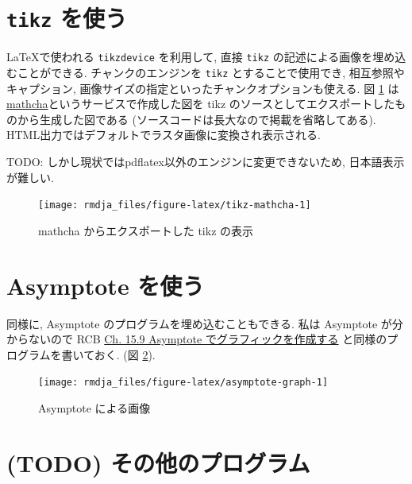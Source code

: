 \documentclass[
  xelatex,ja=standard,jafont=noto]{bxjsbook}
\theoremstyle{definition}
\theoremstyle{definition}
\theoremstyle{definition}
\theoremstyle{definition}
\theoremstyle{remark}
\begin{document}
\hypertarget{tikz-ux3092ux4f7fux3046}{%
\section{\texorpdfstring{\texttt{tikz}
を使う}{tikz を使う}}\label{tikz-ux3092ux4f7fux3046}}

\LaTeX で使われる \texttt{tikzdevice} を利用して, 直接 \texttt{tikz}
の記述による画像を埋め込むことができる. チャンクのエンジンを
\texttt{tikz} とすることで使用でき, 相互参照やキャプション,
画像サイズの指定といったチャンクオプションも使える. 図
\ref{fig:tikz-mathcha}
は\href{https://www.mathcha.io/}{mathcha}というサービスで作成した図を
tikz のソースとしてエクスポートしたものから生成した図である
(ソースコードは長大なので掲載を省略してある).
HTML出力ではデフォルトでラスタ画像に変換され表示される.

TODO: しかし現状ではpdflatex以外のエンジンに変更できないため,
日本語表示が難しい.

\begin{figure}

{\centering \texttt{[image: rmdja\_files/figure-latex/tikz-mathcha-1]} 

}

\caption{mathcha からエクスポートした tikz の表示}\label{fig:tikz-mathcha}
\end{figure}

\hypertarget{asymptote-ux3092ux4f7fux3046}{%
\section{Asymptote を使う}\label{asymptote-ux3092ux4f7fux3046}}

同様に, Asymptote のプログラムを埋め込むこともできる. 私は Asymptote
が分からないので RCB
\href{https://gedevan-aleksizde.github.io/rmarkdown-cookbook/eng-asy.html}{Ch.
15.9 Asymptote でグラフィックを作成する} と同様のプログラムを書いておく.
(図 \ref{fig:asymptote-graph}).

\begin{figure}

{\centering \texttt{[image: rmdja\_files/figure-latex/asymptote-graph-1]} 

}

\caption{Asymptote による画像}\label{fig:asymptote-graph}
\end{figure}

\hypertarget{todo-ux305dux306eux4ed6ux306eux30d7ux30edux30b0ux30e9ux30e0}{%
\section{(TODO)
その他のプログラム}\label{todo-ux305dux306eux4ed6ux306eux30d7ux30edux30b0ux30e9ux30e0}}
\end{document}
